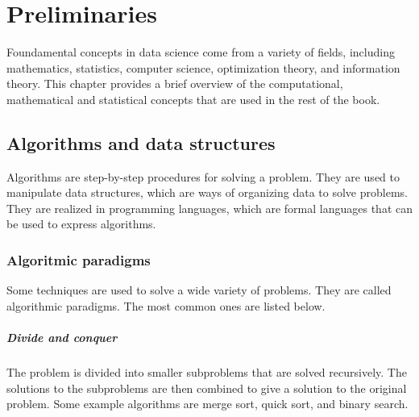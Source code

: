 \chapter{Preliminaries}
\label{chap:preliminaries}


Foundamental concepts in data science come from a variety of fields, including
mathematics, statistics, computer science, optimization theory, and information theory.
This chapter provides a brief overview of the computational, mathematical and statistical
concepts that are used in the rest of the book.

\section{Algorithms and data structures}

Algorithms are step-by-step procedures for solving a problem.  They are used to
manipulate data structures, which are ways of organizing data to solve problems.
They are realized in programming languages, which are formal languages that can be used
to express algorithms.

\subsection{Algoritmic paradigms}

Some techniques are used to solve a wide variety of problems.  They are called
algorithmic paradigms.  The most common ones are listed below.

\paragraph{Divide and conquer}  The problem is divided into smaller subproblems that are
solved recursively.  The solutions to the subproblems are then combined to give a solution
to the original problem.  Some example algorithms are merge sort, quick sort, and binary
search.


